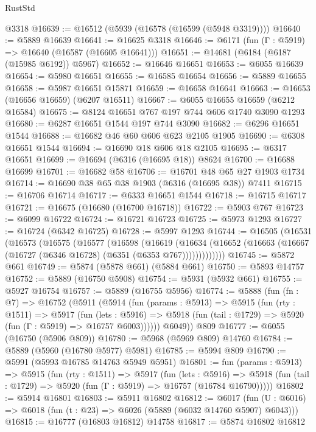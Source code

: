 \begin{lexlean}{RustStd}
\begin{coremodule}
    @3318
@16639 := @16512 (@5939 (@16578 (@16599 (@5948 @3319))))
@16640 := @5889 @16639
@16641 := @16625 @3318
@16646 := @6171 (fun (Γ : @5919) => @16640 (@16587 (@16605 @16641)))
@16651 := @14681 (@6184 (@6187 (@15985 @6192)) @5967)
@16652 := @16646 @16651
@16653 := @6055 @16639
@16654 := @5980 @16651
@16655 := @16585 @16654
@16656 := @5889 @16655
@16658 := @5987 @16651 @15871
@16659 := @16658 @16641
@16663 := @16653 (@16656 @16659) (@6207 @16511)
@16667 := @6055 @16655 @16659 (@6212 @16584)
@16675 := @8124 @16651 @767 @197 @744 @606 @1740 @3090 @1293
@16680 := @6287 @16651 @1544 @197 @744 @3090
@16682 := @6296 @16651 @1544
@16688 := @16682 @46 @60 @606 @623 @2105 @1905
@16690 := @6308 @16651 @1544
@16694 := @16690 @18 @606 @18 @2105
@16695 := @6317 @16651
@16699 := @16694 (@6316 (@16695 @18)) @8624
@16700 := @16688 @16699
@16701 := @16682 @58
@16706 := @16701 @48 @65 @27 @1903 @1734
@16714 := @16690 @38 @65 @38 @1903 (@6316 (@16695 @38)) @7411
@16715 := @16706 @16714
@16717 := @6333 @16651 @1544
@16718 := @16715 @16717
@16721 := @16675 (@16680 (@16700 @16718))
@16722 := @5903 @767
@16723 := @6099 @16722
@16724 := @16721 @16723
@16725 := @5973 @1293
@16727 := @16724 (@6342 @16725)
@16728 := @5997 @1293
@16744 := @16505
    (@16531
      (@16573
        (@16575
          (@16577
            (@16598
              (@16619
                (@16634
                  (@16652 (@16663 (@16667 (@16727 (@6346 @16728) (@6351 (@6353 @767)))))))))))))
@16745 := @5872 @661
@16749 := @5874 (@5878 @661) (@5884 @661)
@16750 := @5893 @14757
@16752 := @5889 (@16750 @5908)
@16754 := @5931 (@5932 @661)
@16755 := @5927 @16754
@16757 := @5889 (@16755 @5956)
@16774 := @5888
    (fun (fn : @7) =>
    @16752
      (@5911
        (@5914
          (fun (params : @5913) =>
          @5915
            (fun (rty : @1511) =>
            @5917
              (fun (lets : @5916) =>
              @5918 (fun (tail : @1729) => @5920 (fun (Γ : @5919) => @16757 @6003))))))
        @6049))
    @809
@16777 := @6055 (@16750 (@5906 @809))
@16780 := @5968 (@5969 @809) @14760
@16784 := @5889 (@5960 (@16780 @5977) @5981)
@16785 := @5994 @809
@16790 := @5991 (@5993 @16785 @14763 @5949 @5951)
@16801 := fun (params : @5913) =>
  @5915
    (fun (rty : @1511) =>
    @5917
      (fun (lets : @5916) =>
      @5918 (fun (tail : @1729) => @5920 (fun (Γ : @5919) => @16757 (@16784 @16790)))))
@16802 := @5914 @16801
@16803 := @5911 @16802
@16812 := @6017
    (fun (U : @6016) => @6018 (fun (t : @23) => @6026 (@5889 (@6032 @14760 @5907) @6043)))
@16815 := @16777 (@16803 @16812) @14758
@16817 := @5874 @16802 @16812

\end{coremodule}
\end{lexlean}
